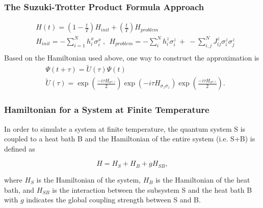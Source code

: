 \documentclass{beamer}
\begin{document}
\begin{frame}
	\frametitle{The Suzuki-Trotter Product Formula Approach}
	\begin{equation*}
		\begin{split}
		&H(t)=(1-\frac{t}{T} )H_{init}+(\frac{t}{T})H_{problem} \\
		&H_{init}= -\sum_{i=1}^{N}h_i^x \sigma_i^x ~,~~ H_{problem}= -\sum_{i}^N h_i^z \sigma^z_i ~+~ -\sum_{i,j}^N J_{ij}^z \sigma^z_i \sigma^z_j\\
		\end{split}
	\end{equation*} 
	Based on the Hamiltonian used above, one way to construct the approximation is 
	\begin{equation*}
	\label{tilde_U}
	\begin{split}
	&\Psi(t+\tau) =\tilde{U}(\tau)\Psi(t)\\
	&\tilde{U}(\tau) = \exp(\frac{-i\tau H_{\sigma^{x,z}}}{2})\exp(-i\tau H_{\sigma_z \sigma_z})\exp(\frac{-i\tau H_{\sigma^{x,z}}}{2}).
	\end{split}
	\end{equation*}

\end{frame}
%






\begin{frame}
	\frametitle{Hamiltonian for a System at Finite Temperature}
	In order to simulate a system at finite temperature, the quantum system S is coupled to a heat bath B and the Hamiltonian of the entire system (i.e. S+B) is defined as
	
	\begin{equation*}
	H = H_S + H_B + gH_{SB},
	\end{equation*} 
	
	where $H_S$ is the Hamiltonian of the system, $H_B$ is the Hamiltonian of the heat bath, and $H_{SB}$ is the interaction between the subsystem S and the heat bath B with $g$ indicates the global coupling strength between S and B. 
\end{frame}
\end{document}
